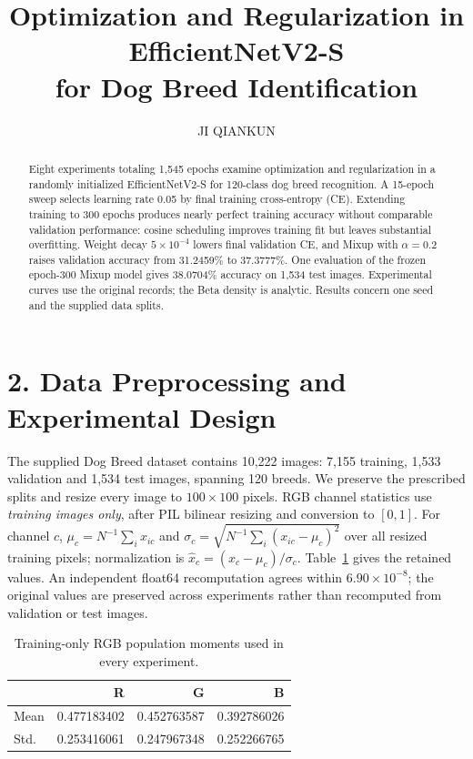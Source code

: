 \documentclass[letterpaper]{article}
\title{Optimization and Regularization in EfficientNetV2-S\protect\\for Dog Breed Identification}
\author{JI QIANKUN}
\begin{document}
\maketitle
\begin{abstract}
Eight experiments totaling 1,545 epochs examine optimization and regularization
in a randomly initialized EfficientNetV2-S for 120-class dog breed recognition.
A 15-epoch sweep selects learning rate 0.05 by final training cross-entropy (CE).
Extending training to 300 epochs produces nearly perfect training accuracy
without comparable validation performance: cosine scheduling improves training
fit but leaves substantial overfitting. Weight decay $5\times10^{-4}$ lowers
final validation CE, and Mixup with $\alpha=0.2$ raises validation accuracy from
31.2459\% to 37.3777\%. One evaluation of the frozen epoch-300 Mixup model gives
38.0704\% accuracy on 1,534 test images. Experimental curves use the original
records; the Beta density is analytic. Results concern one seed and the supplied
data splits.
\end{abstract}

\section{2. Data Preprocessing and Experimental Design}
The supplied Dog Breed dataset contains 10,222 images: 7,155 training, 1,533
validation and 1,534 test images, spanning 120 breeds. We preserve the prescribed
splits and resize every image to $100\times100$ pixels. RGB channel statistics use
\emph{training images only}, after PIL bilinear resizing and conversion to $[0,1]$.
For channel $c$, $\mu_c=N^{-1}\sum_i x_{ic}$ and
$\sigma_c=\sqrt{N^{-1}\sum_i(x_{ic}-\mu_c)^2}$ over all resized training pixels;
normalization is $\hat x_c=(x_c-\mu_c)/\sigma_c$.
Table~\ref{tab:norm} gives the retained values. An independent float64
recomputation agrees within $6.90\times10^{-8}$; the original values are preserved
across experiments rather than recomputed from validation or test images.

\begin{table}[h]
\centering
\begin{tabular}{lrrr}\toprule
 & R & G & B\\\midrule
Mean & 0.477183402 & 0.452763587 & 0.392786026\\
Std. & 0.253416061 & 0.247967348 & 0.252266765\\\bottomrule
\end{tabular}
\normalsize
\caption{Training-only RGB population moments used in every experiment.}
\label{tab:norm}
\end{table}
\end{document}
